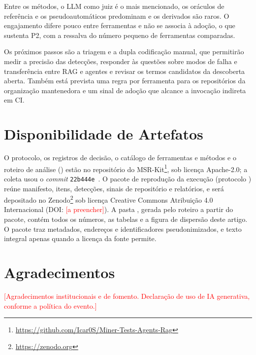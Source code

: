 \documentclass[sigconf]{acmart}
\providecommand{\pend}[1]{\textcolor{red}{[#1]}}
\newcommand{\ColCommit}{22b444e}         %
\begin{document}
Entre os métodos, o LLM como juiz é o mais mencionado, os oráculos de referência e os pseudoautomáticos predominam e os derivados são raros. O engajamento difere pouco entre ferramentas e não se associa à adoção, o que sustenta P2, com a ressalva do número pequeno de ferramentas comparadas.

Os próximos passos são a triagem e a dupla codificação manual, que permitirão medir a precisão das detecções, responder às questões sobre modos de falha e transferência entre RAG e agentes e revisar os termos candidatos da descoberta aberta. Também está prevista uma regra por ferramenta para os repositórios da organização mantenedora e um sinal de adoção que alcance a invocação indireta em CI.

\section*{Disponibilidade de Artefatos}

\begin{sloppypar}
O protocolo, os registros de decisão, o catálogo de ferramentas e métodos e o roteiro de análise () estão no repositório do MSR-Kit\footnote{\url{https://github.com/Icar0S/Miner-Tests-Agents-Rag}}, sob licença Apache-2.0; a coleta usou o \textit{commit} \texttt{\ColCommit}~\cite{msrkit2027}. O pacote de reprodução da execução \texttt{\ResRunId} (protocolo \ResProtocoloSha) reúne manifesto, itens, detecções, sinais de repositório e relatórios, e será depositado no Zenodo\footnote{\url{https://zenodo.org}} sob licença Creative Commons Atribuição 4.0 Internacional (DOI: \pend{a preencher}). A pasta , gerada pelo roteiro a partir do pacote, contém todos os números, as tabelas e a figura de dispersão deste artigo. O pacote traz metadados, endereços e identificadores pseudonimizados, e texto integral apenas quando a licença da fonte permite.
\end{sloppypar}

\section*{Agradecimentos}
\pend{Agradecimentos institucionais e de fomento. Declaração de uso de IA generativa, conforme a política do evento.}



\end{document}
